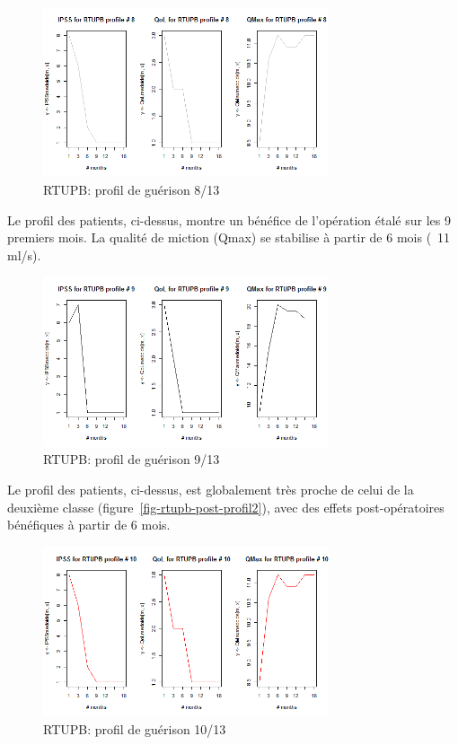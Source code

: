 \begin{figure}[H]
\centering
\includegraphics[width=0.75\textwidth]{../Fig/RTUPB/rtupb-profil-post-08.png}
\caption{RTUPB: profil de guérison 8/13}
\label{fig-rtupb-post-profil8}
\end{figure}

Le profil des patients, ci-dessus, montre un bénéfice de l'opération étalé sur les 9 premiers mois. La qualité de miction (Qmax) se stabilise à partir de 6 mois (~11 ml/s).

\begin{figure}[H]
\centering
\includegraphics[width=0.75\textwidth]{../Fig/RTUPB/rtupb-profil-post-09.png}
\caption{RTUPB: profil de guérison 9/13}
\label{fig-rtupb-post-profil9}
\end{figure}

Le profil des patients, ci-dessus, est globalement très proche de celui de la deuxième classe (figure~\ref{fig-rtupb-post-profil2}), avec des effets post-opératoires bénéfiques à partir de 6 mois.

\begin{figure}[H]
\centering
\includegraphics[width=0.75\textwidth]{../Fig/RTUPB/rtupb-profil-post-10.png}
\caption{RTUPB: profil de guérison 10/13}
\label{fig-rtupb-post-profil10}
\end{figure}

